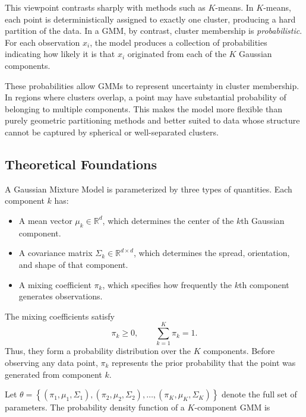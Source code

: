 This viewpoint contrasts sharply with methods such as $K$-means. In $K$-means, each point is deterministically assigned to exactly one cluster, producing a hard partition of the data. In a GMM, by contrast,
cluster membership is \emph{probabilistic}. For each observation $x_i$, the model produces a collection of probabilities indicating how likely it is that $x_i$ originated from each of the $K$ Gaussian components.

These probabilities allow GMMs to represent uncertainty in cluster membership. In regions where clusters overlap, a point may have substantial probability of belonging to multiple components. This makes the model more flexible than purely geometric partitioning methods and better suited to data whose structure cannot be captured by spherical or well-separated clusters.

\bigskip

\subsection*{Theoretical Foundations}

\medskip

A Gaussian Mixture Model is parameterized by three types of quantities. Each component $k$ has:

\begin{itemize}
    \item A mean vector $\mu_k \in \mathbb{R}^d$, which determines the center of the $k$th Gaussian component.
    \item A covariance matrix $\Sigma_k \in \mathbb{R}^{d \times d}$, which determines the spread, orientation, and shape of that component.
    \item A mixing coefficient $\pi_k$, which specifies how frequently the $k$th component generates observations.
\end{itemize}

The mixing coefficients satisfy
\[
\pi_k \ge 0,
\qquad
\sum_{k=1}^K \pi_k = 1.
\]
Thus, they form a probability distribution over the $K$ components.
Before observing any data point, $\pi_k$ represents the prior probability
that the point was generated from component $k$.

\medskip

Let $\theta = \left\{(\pi_1, \mu_1, \Sigma_1), (\pi_2, \mu_2, \Sigma_2), \dots, (\pi_K, \mu_K, \Sigma_K) \right\}$ denote the full set of
parameters. The probability density function of a $K$-component GMM is

